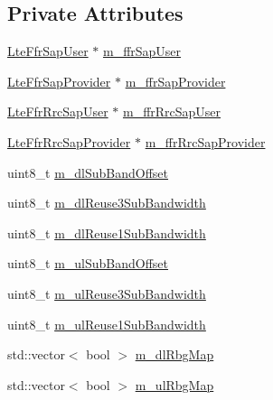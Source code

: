 \subsection*{Private Attributes}
\begin{DoxyCompactItemize}
\item 
\hyperlink{classns3_1_1LteFfrSapUser}{Lte\+Ffr\+Sap\+User} $\ast$ \hyperlink{classns3_1_1LteFfrEnhancedAlgorithm_abd8cf8a62932a3863b168a3035810068}{m\+\_\+ffr\+Sap\+User}
\item 
\hyperlink{classns3_1_1LteFfrSapProvider}{Lte\+Ffr\+Sap\+Provider} $\ast$ \hyperlink{classns3_1_1LteFfrEnhancedAlgorithm_a2d102293f5576be40dbb14150e5cd9c2}{m\+\_\+ffr\+Sap\+Provider}
\item 
\hyperlink{classns3_1_1LteFfrRrcSapUser}{Lte\+Ffr\+Rrc\+Sap\+User} $\ast$ \hyperlink{classns3_1_1LteFfrEnhancedAlgorithm_a9816c42b3b453de22dcb9298850c6472}{m\+\_\+ffr\+Rrc\+Sap\+User}
\item 
\hyperlink{classns3_1_1LteFfrRrcSapProvider}{Lte\+Ffr\+Rrc\+Sap\+Provider} $\ast$ \hyperlink{classns3_1_1LteFfrEnhancedAlgorithm_ad8b147a7e4d81cba8e4f39046d4eebce}{m\+\_\+ffr\+Rrc\+Sap\+Provider}
\item 
uint8\+\_\+t \hyperlink{classns3_1_1LteFfrEnhancedAlgorithm_a4bef25161f73b33a50e4caead81be03c}{m\+\_\+dl\+Sub\+Band\+Offset}
\item 
uint8\+\_\+t \hyperlink{classns3_1_1LteFfrEnhancedAlgorithm_af53f7ff28e091ad65b5ccf2e04c9da98}{m\+\_\+dl\+Reuse3\+Sub\+Bandwidth}
\item 
uint8\+\_\+t \hyperlink{classns3_1_1LteFfrEnhancedAlgorithm_a94ed6d631c21c643996662c9da64f294}{m\+\_\+dl\+Reuse1\+Sub\+Bandwidth}
\item 
uint8\+\_\+t \hyperlink{classns3_1_1LteFfrEnhancedAlgorithm_a063de191d200ce49e14493870f137f23}{m\+\_\+ul\+Sub\+Band\+Offset}
\item 
uint8\+\_\+t \hyperlink{classns3_1_1LteFfrEnhancedAlgorithm_aeba3c6e0cfade18210df32c194ae0b64}{m\+\_\+ul\+Reuse3\+Sub\+Bandwidth}
\item 
uint8\+\_\+t \hyperlink{classns3_1_1LteFfrEnhancedAlgorithm_ab9c78df9b179b67fe8aebc4155f163da}{m\+\_\+ul\+Reuse1\+Sub\+Bandwidth}
\item 
std\+::vector$<$ bool $>$ \hyperlink{classns3_1_1LteFfrEnhancedAlgorithm_a41d817562dac8a40e51d257acf55ea24}{m\+\_\+dl\+Rbg\+Map}
\item 
std\+::vector$<$ bool $>$ \hyperlink{classns3_1_1LteFfrEnhancedAlgorithm_ad39a63466abc12b05aebef64acab0f32}{m\+\_\+ul\+Rbg\+Map}
\item 

\end{DoxyCompactItemize}
